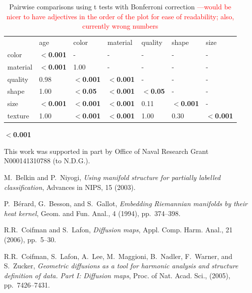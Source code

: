 \documentclass{pnastwo}
\newcommand{\red}[1]{\textcolor{Red}{#1}}
\begin{document}
\begin{article}
\begin{materials}
\begin{table}
	
\begin{tabular}{lllllll}
	   &    age & color & material & quality & shape & size  \\ 
color &		\textbf{$<$0.001} & -       & -        & - & - & - \\      
material &	\textbf{$<$0.001} & 1.00 & -        & - & - & - \\      
quality & 	0.98 & \textbf{$<$0.001} & \textbf{$<$0.001}  & - & - & - \\      
shape & 	1.00 & \textbf{$<$0.05} & \textbf{$<$0.001}  & \textbf{$<$0.05} & - & - \\     
size & 		\textbf{$<$0.001} & \textbf{$<$0.001} & \textbf{$<$0.001}  & 0.11 & \textbf{$<$0.001} & - \\     
texture & 	1.00 & \textbf{$<$0.001} & \textbf{$<$0.001}  & 1.00 & 0.30 & \textbf{$<$0.001}
\end{tabular}
\caption{Pairwise comparisons using t tests with Bonferroni correction \red{---would be nicer to have adjectives in the order of the plot for ease of readability; also, currently wrong numbers}}
\end{table}

\textbf{$<$0.001}



\end{materials}

\begin{acknowledgments}
This work was supported in part by Office of Naval Research Grant N000141310788 (to N.D.G.).
\end{acknowledgments}

\begin{thebibliography}{10}
M.~Belkin and P.~Niyogi, {\em Using manifold structure for partially
  labelled classification}, Advances in NIPS, 15 (2003).

P.~B\'erard, G.~Besson, and S.~Gallot, {\em Embedding {R}iemannian
  manifolds by their heat kernel}, Geom. and Fun. Anal., 4 (1994),
  pp.~374--398.

R.R.~Coifman and S.~Lafon, {\em Diffusion maps}, Appl. Comp. Harm. Anal.,
  21 (2006), pp.~5--30.

R.R.~Coifman, S.~Lafon, A.~Lee, M.~Maggioni, B.~Nadler, F.~Warner, and
  S.~Zucker, {\em Geometric diffusions as a tool for harmonic analysis and
  structure definition of data. {P}art {I}: Diffusion maps}, Proc. of Nat.
  Acad. Sci.,  (2005), pp.~7426--7431.


\end{thebibliography}
\end{article}
\end{document}
